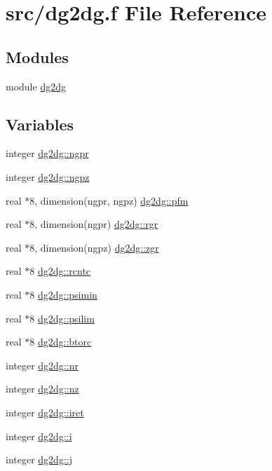 \hypertarget{dg2dg_8f}{
\section{src/dg2dg.f File Reference}
\label{dg2dg_8f}
}
\subsection*{Modules}
\begin{CompactItemize}
\item 
module \hyperlink{namespacedg2dg}{dg2dg}
\end{CompactItemize}
\subsection*{Variables}
\begin{CompactItemize}
\item 
integer \hyperlink{namespacedg2dg_e9a7ecb72eab0642c64a97ca91c13b0a}{dg2dg::ngpr}
\item 
integer \hyperlink{namespacedg2dg_e7dd506213bbb6cba705ecab71df0a94}{dg2dg::ngpz}
\item 
real $\ast$8, dimension(ngpr, ngpz) \hyperlink{namespacedg2dg_401e9ba4eb2cfdba5f316ce35f5d2dd4}{dg2dg::pfm}
\item 
real $\ast$8, dimension(ngpr) \hyperlink{namespacedg2dg_f36a00895bcd828127ea8f8a115978ce}{dg2dg::rgr}
\item 
real $\ast$8, dimension(ngpz) \hyperlink{namespacedg2dg_35685ffad7953d2a38165725ba540d49}{dg2dg::zgr}
\item 
real $\ast$8 \hyperlink{namespacedg2dg_19f3394ca4f1ef71cd6de32f9d199b7b}{dg2dg::rcntc}
\item 
real $\ast$8 \hyperlink{namespacedg2dg_b51d79dfb19c6827c5e2540a7f283f23}{dg2dg::psimin}
\item 
real $\ast$8 \hyperlink{namespacedg2dg_5abf8e2b92fc98dcb269d20099028451}{dg2dg::psilim}
\item 
real $\ast$8 \hyperlink{namespacedg2dg_86019e86ab8b07942741fe80210d5a93}{dg2dg::btorc}
\item 
integer \hyperlink{namespacedg2dg_b3df22b96364892fd08e20a2d00bc877}{dg2dg::nr}
\item 
integer \hyperlink{namespacedg2dg_d946d8fc014faceab571c2af730bc414}{dg2dg::nz}
\item 
integer \hyperlink{namespacedg2dg_ded4078812d7ca1eda5041303ad4cf55}{dg2dg::iret}
\item 
integer \hyperlink{namespacedg2dg_4c909ba87dbff09a900fd0ad334a474a}{dg2dg::i}
\item 
integer \hyperlink{namespacedg2dg_3712f36ad01bfd23258b66f4b9fdaa5b}{dg2dg::j}
\end{CompactItemize}
